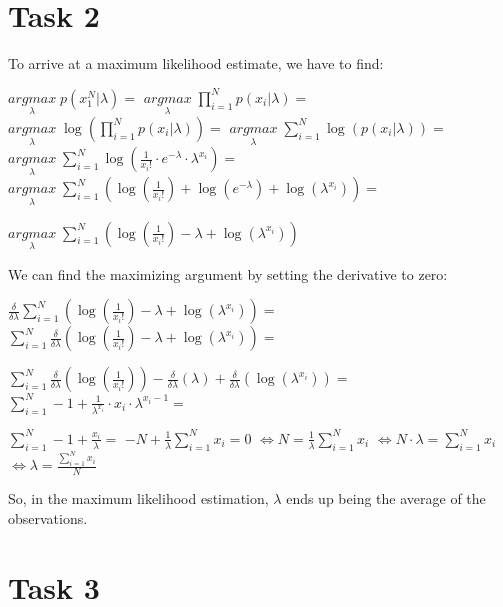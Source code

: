 \documentclass[%
   11pt,              %
   ngerman,           %
   a4paper,           %
   DIV11,             %
]{scrartcl}%
\begin{document}
\section*{Task 2}

To arrive at a maximum likelihood estimate, we have to find:

$\underset{\lambda}{arg max}\; p(x_1^N|\lambda) = $
$\underset{\lambda}{arg max}\;  \displaystyle\prod_{i= 1}^N p(x_i|\lambda) = $
$\underset{\lambda}{arg max}\;  \log(\displaystyle\prod_{i= 1}^N p(x_i|\lambda)) = $
$\underset{\lambda}{arg max}\;  \displaystyle\sum_{i= 1}^N \log(p(x_i|\lambda)) = $
$\underset{\lambda}{arg max}\;  \displaystyle\sum_{i= 1}^N \log(\frac{1}{x_i!}\cdot e^{-\lambda}\cdot \lambda^{x_i} ) = $
$\underset{\lambda}{arg max}\;  \displaystyle\sum_{i= 1}^N (\log(\frac{1}{x_i!}) + \log(e^{-\lambda}) + \log(\lambda^{x_i} )) = $

$\underset{\lambda}{arg max}\;  \displaystyle\sum_{i= 1}^N (\log(\frac{1}{x_i!}) - \lambda + \log(\lambda^{x_i} ))$

We can find the maximizing argument by setting the derivative to zero:

$\frac{\delta}{\delta\lambda} \displaystyle\sum_{i= 1}^N (\log(\frac{1}{x_i!}) - \lambda + \log(\lambda^{x_i} )) = $
$\displaystyle\sum_{i= 1}^N \frac{\delta}{\delta\lambda} (\log(\frac{1}{x_i!}) - \lambda + \log(\lambda^{x_i} )) = $

$\displaystyle\sum_{i= 1}^N \frac{\delta}{\delta\lambda} (\log(\frac{1}{x_i!})) - \frac{\delta}{\delta\lambda}(\lambda) + \frac{\delta}{\delta\lambda}(\log(\lambda^{x_i})) = $
$\displaystyle\sum_{i= 1}^N - 1 + \frac{1}{\lambda^{x_i}} \cdot x_i \cdot \lambda^{x_i-1} = $

$\displaystyle\sum_{i= 1}^N - 1 + \frac{x_i}{\lambda} = $
$-N + \frac{1}{\lambda} \displaystyle\sum_{i= 1}^N   x_i= 0$
$\iff N =\frac{1}{\lambda}\displaystyle\sum_{i= 1}^N  x_i$
$\iff N\cdot \lambda =\displaystyle\sum_{i= 1}^N  x_i$
$\iff \lambda =\frac{\sum_{i= 1}^N  x_i}{N}$

So, in the maximum likelihood estimation, $\lambda$ ends up being the average of the observations.
\section*{Task 3}
\end{document}
